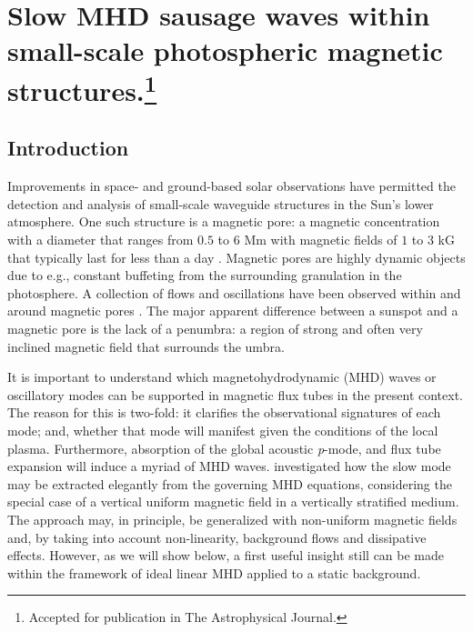\graphicspath{{Chapter4/Figs/}}

\chapter[Slow MHD sausage waves]{Slow MHD sausage waves within small-scale photospheric magnetic structures.\footnote{Accepted for publication in The Astrophysical Journal.}}
\label{chapter4}

   \vspace*{\fill}\par
   \pagebreak

\section{Introduction}
\label{Intro}
    
    Improvements in space- and ground-based solar observations have permitted the detection and analysis of small-scale waveguide structures in the Sun's lower atmosphere.
    One such structure is a magnetic pore: a magnetic concentration with a diameter that ranges from $0.5$ to $6$ Mm with magnetic fields of $1$ to $3$ kG that typically last for less than a day \citep{1970SoPh...13...85S}.
    Magnetic pores are highly dynamic objects due to e.g., constant buffeting from the surrounding granulation in the photosphere.
    A collection of flows and oscillations have been observed within and around magnetic pores \citep{1999SoPh..187..389B,2002A&A...383..275H,2002A&A...395..249R,doretalb,SAO,Dorotovic2014,freij2014,jess2015multiwavelength,2015A&A...579A..73M}.
    The major apparent difference between a sunspot and a magnetic pore is the lack of a penumbra: a region of strong and often very inclined magnetic field that surrounds the umbra. 
    
    It is important to understand which magnetohydrodynamic (MHD) waves or oscillatory modes can be supported in magnetic flux tubes in the present context.
    The reason for this is two-fold: it clarifies the observational signatures of each mode; and, whether that mode will manifest given the conditions of the local plasma. 
    Furthermore, absorption of the global acoustic \textit{p}-mode, and flux tube expansion will induce a myriad of MHD waves.	
    \citet{roberts} investigated how the slow mode may be extracted elegantly from the governing MHD equations, considering the special case of a vertical uniform magnetic field in a vertically stratified medium.
    The approach may, in principle, be generalized with non-uniform magnetic fields \citep{luna-cardozo} and, by taking into account non-linearity, background flows and dissipative effects.
    However, as we will show below, a first useful insight still can be made within the framework of ideal linear MHD applied to a static background.
    
